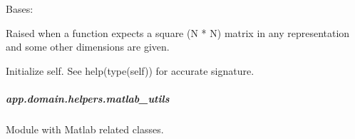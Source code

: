 \documentclass[letterpaper,10pt,english]{sphinxmanual}
\begin{document}

\begin{fulllineitems}
\label{\detokenize{app.domain.helpers:app.domain.helpers.exceptions.MatrixNotSquareError}}
Bases: 

Raised when a function expects a square (N * N) matrix in any
representation and some other dimensions are given.

\begin{fulllineitems}
\label{\detokenize{app.domain.helpers:app.domain.helpers.exceptions.MatrixNotSquareError.__init__}}
Initialize self.  See help(type(self)) for accurate signature.

\end{fulllineitems}


\end{fulllineitems}



\subparagraph{app.domain.helpers.matlab\_utils}
\label{\detokenize{app.domain.helpers:module-app.domain.helpers.matlab_utils}}\label{\detokenize{app.domain.helpers:app-domain-helpers-matlab-utils}}
Module with Matlab related classes.
\end{document}

